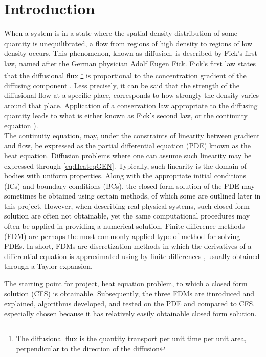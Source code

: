 \documentclass[%
oneside,                 %
final,                   %
10pt]{article}
\begin{document}
\section{Introduction}
When a system is in a state where the spatial density distribution of some quantity is unequilibrated, a flow from regions of high density to regions of low density occurs. This phenomenon, known as diffusion, is described by Fick's first law, named after the German physician Adolf Eugen Fick. Fick's first law states that the diffusional flux \footnote{The diffusional flux is the quantity transport per unit time per unit area, perpendicular to the direction of the diffusion} is proportional to the concentration gradient of the diffusing component \citep[pp. 339-340]{MatSci}. Less precisely, it can be said that the strength of the diffusional flow at a specific place, corresponds to how strongly the density varies around that place. Application of a conservation law appropriate to the diffusing quantity leads to what is either known as Fick's second law, or the continuity equation \citep[pp.341-342]{MatSci}). \\
The continuity equation, may, under the constraints of linearity between gradient and flow, be expressed as the partial differential equation (PDE) known as the heat equation. Diffusion problems where one can assume such linearity may be expressed through \eqref{eq:HeateqGEN}. Typically, such linearity is the domain of bodies with uniform properties. Along with the appropriate initial conditions (ICs) and boundary conditions (BCs), the closed form solution of the PDE may sometimes be obtained using certain methods, of which some are outlined later in this project. However, when describing real physical systems, such closed form solution are often not obtainable, yet the same computational procedures may often be applied in providing a numerical solution. Finite-difference methods (FDM) are perhaps the most commonly applied type of method for solving PDEs. In short, FDMs are discretization methods in which the derivatives of a differential equation is approximated using by finite differences \citep[p. 46]{compPDE}, usually obtained through a Taylor expansion. \newline

The starting point for project, heat equation problem, to which a closed form solution (CFS) is obtainable. Subsequently, the three FDMs are itnroduced and explained, algorithms developed, and tested on the PDE and compared to CFS.   especially chosen because it has relatively easily obtainable closed form solution. 
\end{document}
